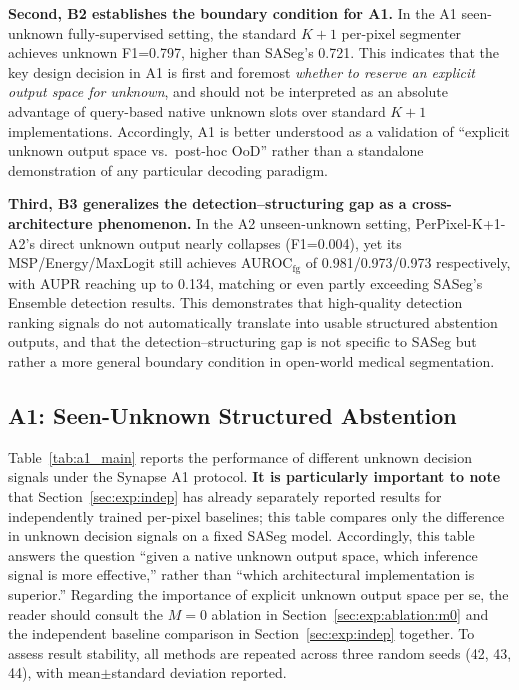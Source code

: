 \documentclass[3p,twocolumn,authoryear]{elsarticle}
\begin{document}
\textbf{Second, B2 establishes the boundary condition for A1.}
In the A1 seen-unknown fully-supervised setting, the standard $K+1$ per-pixel
segmenter achieves unknown F1=0.797, higher than SASeg's 0.721.
This indicates that the key design decision in A1 is first and foremost
\emph{whether to reserve an explicit output space for unknown}, and should not be
interpreted as an absolute advantage of query-based native unknown slots over standard
$K+1$ implementations.
Accordingly, A1 is better understood as a validation of ``explicit unknown output space
vs.\ post-hoc OoD'' rather than a standalone demonstration of any particular decoding paradigm.

\textbf{Third, B3 generalizes the detection--structuring gap as a cross-architecture
phenomenon.}
In the A2 unseen-unknown setting, PerPixel-K+1-A2's direct unknown output nearly
collapses (F1=0.004), yet its MSP/Energy/MaxLogit still achieves
AUROC$_{\text{fg}}$ of 0.981/0.973/0.973 respectively, with AUPR reaching up to 0.134,
matching or even partly exceeding SASeg's Ensemble detection results.
This demonstrates that high-quality detection ranking signals do not automatically
translate into usable structured abstention outputs, and that the detection--structuring
gap is not specific to SASeg but rather a more general boundary condition in open-world
medical segmentation.

\subsection{A1: Seen-Unknown Structured Abstention}\label{sec:exp:a1}

Table~\ref{tab:a1_main} reports the performance of different unknown decision signals
under the Synapse A1 protocol.
\textbf{It is particularly important to note} that Section~\ref{sec:exp:indep} has
already separately reported results for independently trained per-pixel baselines;
this table compares only the difference in unknown decision signals on a fixed SASeg
model.
Accordingly, this table answers the question ``given a native unknown output space,
which inference signal is more effective,'' rather than ``which architectural
implementation is superior.''
Regarding the importance of explicit unknown output space per se, the reader should
consult the $M=0$ ablation in Section~\ref{sec:exp:ablation:m0} and the independent
baseline comparison in Section~\ref{sec:exp:indep} together.
To assess result stability, all methods are repeated across three random seeds
(42, 43, 44), with mean$\pm$standard deviation reported.
\end{document}
